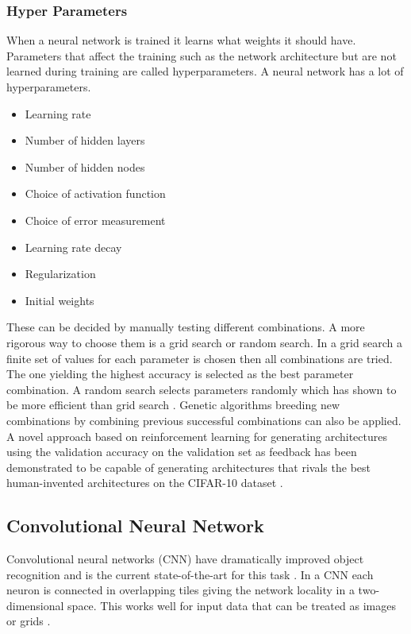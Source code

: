 \documentclass{kththesis}
\begin{document}
\subsubsection{Hyper Parameters}
When a neural network is trained it learns what weights it should have. Parameters that affect the training such as the network architecture but are not learned during training are called hyperparameters. A neural network has a lot of hyperparameters.
\begin{itemize}
\item Learning rate
\item Number of hidden layers
\item Number of hidden nodes
\item Choice of activation function
\item Choice of error measurement
\item Learning rate decay
\item Regularization
\item Initial weights
\end{itemize}
These can be decided by manually testing different combinations. A more rigorous way to choose them is a grid search or random search. In a grid search a finite set of values for each parameter is chosen then all combinations are tried. The one yielding the highest accuracy is selected as the best parameter combination. A random search selects parameters randomly which has shown to be more efficient than grid search \cite{bergstra2012random}. Genetic algorithms breeding new combinations  by combining previous successful combinations can also be applied. A novel approach based on reinforcement learning for generating architectures using the validation accuracy  on the validation set as feedback has been demonstrated to be capable of generating architectures  that rivals the best human-invented architectures on the CIFAR-10 dataset \cite{DBLP:journals/corr/ZophL16}.

\subsection{Convolutional Neural Network}

Convolutional neural networks (CNN) have dramatically improved object recognition and is the current state-of-the-art for this task \cite{szegedy2015going}. In a CNN  each neuron is connected in overlapping tiles giving  the network  locality in a two-dimensional space. This works well for input data that can be treated as images or grids \cite{szegedy2015going}.
\end{document}
